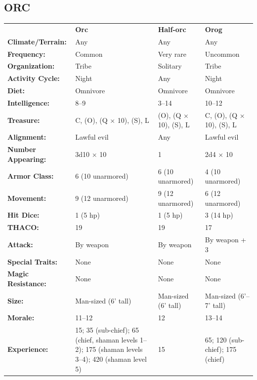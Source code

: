 \noindent
\begin{minipage}{\columnwidth}

\subsection{ORC}

\noindent \begin{tabular}{p{}g{.23\columnwidth}p{.23\columnwidth}g{.23\columnwidth}}
	& \textbf{Orc}	& \textbf{Half-orc}	& \textbf{Orog}	\\
\textbf{Climate/Terrain:}	& Any	& Any	& Any	\\
\textbf{Frequency:} 		& Common	& Very rare	& Uncommon	\\
\textbf{Organization:} 		& Tribe	& Solitary	& Tribe	\\
\textbf{Activity Cycle:} 	& Night	& Any	& Night	\\
\textbf{Diet:} 				& Omnivore	& Omnivore	& Omnivore	\\
\textbf{Intelligence:} 		& 8--9	& 3--14	& 10--12	\\
\textbf{Treasure:} 			& C, (O), (Q $\times$ 10), (S), L	& (O), (Q $\times$ 10), (S), L	& C, (O), (Q $\times$ 10), (S), L	\\
\textbf{Alignment:} 		& Lawful evil	& Any	& Lawful evil	\\
\hline
\textbf{Number Appearing:} 	& 3d10 $\times$ 10	& 1	& 2d4 $\times$ 10	\\
\textbf{Armor Class:} 		& 6 (10 unarmored)	& 6 (10 unarmored)	& 4 (10 unarmored)	\\
\textbf{Movement:} 			& 9 (12 unarmored)	& 9 (12 unarmored)	& 6 (12 unarmored)	\\
\textbf{Hit Dice:} 			& 1 (5 hp)	& 1 (5 hp)	& 3 (14 hp)	\\
\textbf{THACO:} 			& 19	& 19	& 17	\\
\textbf{Attack:} 			& By weapon	& By weapon	& By weapon + 3	\\
\textbf{Special Traits:} & None	& None	& None	\\
\textbf{Magic Resistance:} 	& None	& None	& None	\\
\textbf{Size:} 				& Man-sized (6' tall)	& Man-sized (6' tall)	& Man-sized (6'--7' tall)	\\
\textbf{Morale:} 			& 11--12	& 12	& 13--14	\\
\textbf{Experience:} 		& 15; 35 (sub-chief); 65 (chief, shaman levels 1--2); 175 (shaman levels 3--4); 420 (shaman level 5)	& 15	& 65; 120 (sub-chief); 175 (chief)	\\ %
\end{tabular}

\end{minipage}

